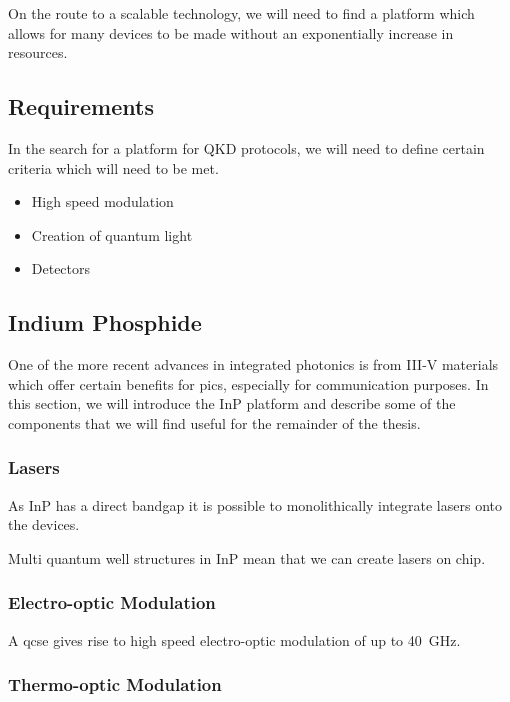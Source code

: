 On the route to a scalable technology, we will need to find a platform which allows for many devices to be made without an exponentially increase in resources. 

\subsection{Requirements}

In the search for a platform for \ac{QKD} protocols, we will need to define certain criteria which will need to be met.

\begin{itemize}
	\item High speed modulation
	\item Creation of quantum light
	\item Detectors
\end{itemize}



\subsection{Indium Phosphide}

One of the more recent advances in integrated photonics is from III-V materials which offer certain benefits for \acp{pic}, especially for communication purposes. In this section, we will introduce the \acl{InP} platform and describe some of the components that we will find useful for the remainder of the thesis.

\subsubsection*{Lasers}

As \ac{InP} has a direct bandgap it is possible to monolithically integrate lasers onto the devices. 

Multi quantum well structures in \ac{InP} mean that we can create lasers on chip.

\subsubsection*{Electro-optic Modulation}

A \ac{qcse} gives rise to high speed electro-optic modulation of up to \SI{40}{GHz}.

\subsubsection*{Thermo-optic Modulation}

